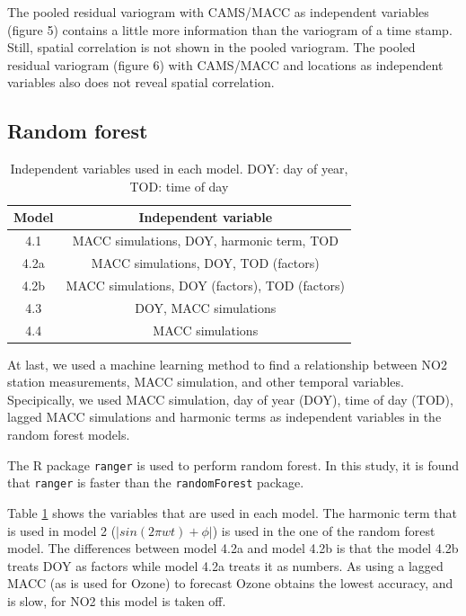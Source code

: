\documentclass{article}
\begin{document}
The pooled residual variogram with CAMS/MACC as independent variables
(figure 5) contains a little more
information than the variogram of a time stamp. Still, spatial
correlation is not shown in the pooled variogram. The pooled residual
variogram (figure 6) with CAMS/MACC and
locations as independent variables also does not reveal spatial
correlation.


\subsection{Random forest}

\begin{table}[tbp]
\centering
\begin{tabular}{ c c  }
Model &  Independent variable\\ \hline 

 4.1 & MACC simulations, DOY, harmonic term, TOD \\
 4.2a & MACC simulations, DOY, TOD (factors) \\
 4.2b & MACC simulations, DOY (factors), TOD (factors) \\ 
 4.3 & DOY, MACC simulations \\
 4.4 & MACC simulations  \\  \hline
\end{tabular}
\caption{Independent variables used in each model. DOY: day of year, TOD: time of day  } 
\label{table:rf}
\end{table}

At last, we used a machine learning method to find a relationship
between NO2 station measurements, MACC simulation, and other temporal
variables. Specipically, we used MACC simulation, day of year (DOY),
time of day (TOD), lagged MACC simulations and harmonic terms as
independent variables in the random forest models.

The R package \texttt{ranger} is used to perform random forest. In
this study, it is found that \texttt{ranger} is faster than the
\texttt{randomForest} package. 

Table \ref{table:rf} shows the variables that are used in each
model. The harmonic term that is used in model 2
($|sin(2 \pi wt) + \phi|$) is used in the one of the random forest
model. The differences between model 4.2a and model 4.2b is that the
model 4.2b treats DOY as factors while model 4.2a treats it as
numbers. As using a lagged MACC (as is used for Ozone) to forecast
Ozone obtains the lowest accuracy, and is slow, for NO2 this model is
taken off. 
\end{document}
